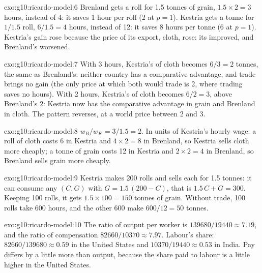 \begin{solution}{exo:g10:ricardo-model:6}
Brenland gets a roll for 1.5 tonnes of grain, $1.5 \times 2 = 3$ hours, instead of 4: it saves 1 hour per roll
(2 at $p = 1$). Kestria gets a tonne for $1/1.5$ roll, $6/1.5 = 4$ hours, instead of 12: it saves 8 hours per tonne
(6 at $p = 1$). Kestria's gain rose because the price of its export, cloth, rose: its  improved, and
Brenland's worsened.
\end{solution}

\begin{solution}{exo:g10:ricardo-model:7}
With 3 hours, Kestria's  of cloth becomes $6/3 = 2$ tonnes, the same as Brenland's: neither country has
a comparative advantage, and trade brings no gain (the only price at which both would trade is 2, where trading
saves no hours). With 2 hours, Kestria's  of cloth becomes $6/2 = 3$, above Brenland's 2: Kestria now
has the comparative advantage in grain and Brenland in cloth. The pattern reverses, at a world price between 2 and 3.
\end{solution}

\begin{solution}{exo:g10:ricardo-model:8}
$w_B/w_K = 3/1.5 = 2$. In units of Kestria's hourly wage: a roll of cloth costs 6 in Kestria and $4 \times 2 = 8$ in
Brenland, so Kestria sells cloth more cheaply; a tonne of grain costs 12 in Kestria and $2 \times 2 = 4$ in Brenland, so
Brenland sells grain more cheaply.
\end{solution}

\begin{solution}{exo:g10:ricardo-model:9}
Kestria makes 200 rolls and sells each for 1.5 tonnes: it can consume any $(C, G)$ with $G = 1.5\,(200 - C)$, that is
$1.5\,C + G = 300$. Keeping 100 rolls, it gets $1.5 \times 100 = 150$ tonnes of grain. Without trade, 100 rolls take 600
hours, and the other 600 make $600/12 = 50$ tonnes.
\end{solution}

\begin{solution}{exo:g10:ricardo-model:10}
The ratio of output per worker is $139680/19440 \approx 7.19$, and the ratio of compensation
$82660/10370 \approx 7.97$. Labour's share: $82660/139680 \approx
0.59$ in the United States and $10370/19440 \approx 0.53$ in India. Pay differs by a little more than output, because
the share paid to labour is a little higher in the United States.
\end{solution}

